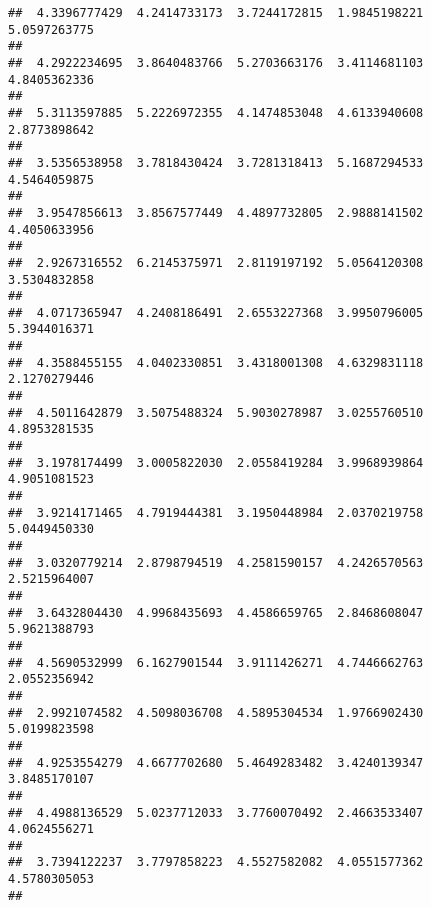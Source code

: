 \documentclass[]{article}
\begin{document}
\begin{verbatim}
##  4.3396777429  4.2414733173  3.7244172815  1.9845198221  5.0597263775 
##                                                                       
##  4.2922234695  3.8640483766  5.2703663176  3.4114681103  4.8405362336 
##                                                                       
##  5.3113597885  5.2226972355  4.1474853048  4.6133940608  2.8773898642 
##                                                                       
##  3.5356538958  3.7818430424  3.7281318413  5.1687294533  4.5464059875 
##                                                                       
##  3.9547856613  3.8567577449  4.4897732805  2.9888141502  4.4050633956 
##                                                                       
##  2.9267316552  6.2145375971  2.8119197192  5.0564120308  3.5304832858 
##                                                                       
##  4.0717365947  4.2408186491  2.6553227368  3.9950796005  5.3944016371 
##                                                                       
##  4.3588455155  4.0402330851  3.4318001308  4.6329831118  2.1270279446 
##                                                                       
##  4.5011642879  3.5075488324  5.9030278987  3.0255760510  4.8953281535 
##                                                                       
##  3.1978174499  3.0005822030  2.0558419284  3.9968939864  4.9051081523 
##                                                                       
##  3.9214171465  4.7919444381  3.1950448984  2.0370219758  5.0449450330 
##                                                                       
##  3.0320779214  2.8798794519  4.2581590157  4.2426570563  2.5215964007 
##                                                                       
##  3.6432804430  4.9968435693  4.4586659765  2.8468608047  5.9621388793 
##                                                                       
##  4.5690532999  6.1627901544  3.9111426271  4.7446662763  2.0552356942 
##                                                                       
##  2.9921074582  4.5098036708  4.5895304534  1.9766902430  5.0199823598 
##                                                                       
##  4.9253554279  4.6677702680  5.4649283482  3.4240139347  3.8485170107 
##                                                                       
##  4.4988136529  5.0237712033  3.7760070492  2.4663533407  4.0624556271 
##                                                                       
##  3.7394122237  3.7797858223  4.5527582082  4.0551577362  4.5780305053 
##                                                                       

\end{verbatim}
\end{document}
